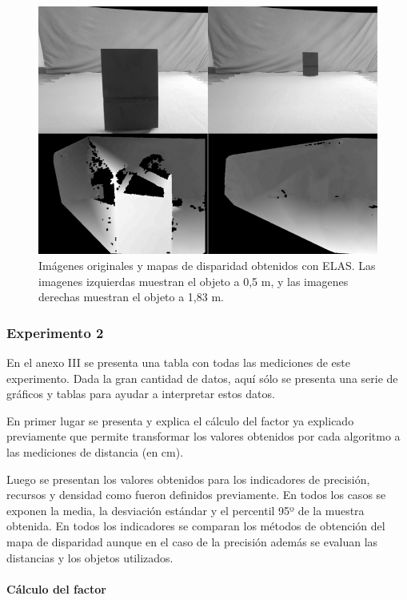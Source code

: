 \documentclass[11pt,a4paper,titlepage]{article}
\begin{document}
\begin{figure}[h!]

  \centering
    \includegraphics[width=1\textwidth]{f10.png}
  \caption{Imágenes originales y mapas de disparidad obtenidos con ELAS. Las imagenes izquierdas muestran el objeto a 0,5 m, y las imagenes derechas muestran el objeto a 1,83 m.}
\end{figure}

\subsubsection{Experimento 2}

En el anexo III se presenta una tabla con todas las mediciones de este experimento. Dada la gran cantidad de datos, aquí sólo se presenta una serie de gráficos y tablas para ayudar a interpretar estos datos.

En primer lugar se presenta y explica el cálculo del factor ya explicado previamente que permite transformar los valores obtenidos por cada algoritmo a las mediciones de distancia (en cm).

Luego se presentan los valores obtenidos para los indicadores de precisión, recursos y densidad como fueron definidos previamente. En todos los casos se exponen la media, la desviación estándar y el percentil 95º de la muestra obtenida. En todos los indicadores se comparan los métodos de obtención del mapa de disparidad aunque en el caso de la precisión además se evaluan las distancias y los objetos utilizados.

\paragraph{Cálculo del factor}
\hfill \break
\end{document}
